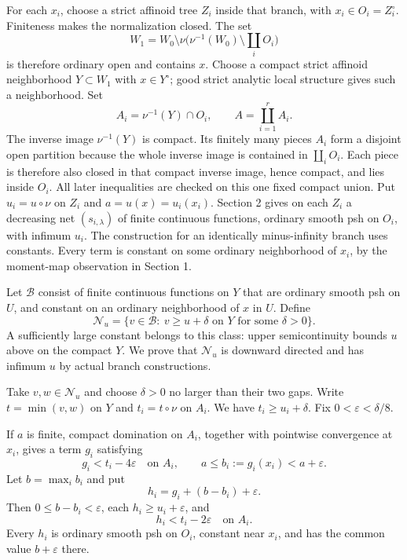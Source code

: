 \documentclass[
  11pt,
]{article}
\begin{document}
For each \(x_i\), choose a strict affinoid tree \(Z_i\) inside that
branch, with \(x_i\in O_i=Z_i^\circ\). Finiteness makes the
normalization closed. The set \[
W_1=W_0\setminus\nu\bigl(\nu^{-1}(W_0)\setminus\textstyle\coprod_i O_i\bigr)
\] is therefore ordinary open and contains \(x\). Choose a compact
strict affinoid neighborhood \(Y\subset W_1\) with \(x\in Y^\circ\);
good strict analytic local structure gives such a neighborhood. Set \[
A_i=\nu^{-1}(Y)\cap O_i,
\qquad A=\coprod_{i=1}^r A_i.
\] The inverse image \(\nu^{-1}(Y)\) is compact. Its finitely many
pieces \(A_i\) form a disjoint open partition because the whole inverse
image is contained in \(\coprod_i O_i\). Each piece is therefore also
closed in that compact inverse image, hence compact, and lies inside
\(O_i\). All later inequalities are checked on this one fixed compact
union. Put \(u_i=u\circ\nu\) on \(Z_i\) and \(a=u(x)=u_i(x_i)\). Section
2 gives on each \(Z_i\) a decreasing net \((s_{i,\lambda})\) of finite
continuous functions, ordinary smooth psh on \(O_i\), with infimum
\(u_i\). The construction for an identically minus-infinity branch uses
constants. Every term is constant on some ordinary neighborhood of
\(x_i\), by the moment-map observation in Section 1.

Let \(\mathcal B\) consist of finite continuous functions on \(Y\) that
are ordinary smooth psh on \(U\), and constant on an ordinary
neighborhood of \(x\) in \(U\). Define \[
\mathcal N_u=\{v\in\mathcal B:\ v\geq u+\delta\text{ on }Y
\text{ for some }\delta>0\}.
\] A sufficiently large constant belongs to this class: upper
semicontinuity bounds \(u\) above on the compact \(Y\). We prove that
\(\mathcal N_u\) is downward directed and has infimum \(u\) by actual
branch constructions.

Take \(v,w\in\mathcal N_u\) and choose \(\delta>0\) no larger than their
two gaps. Write \(t=\min(v,w)\) on \(Y\) and \(t_i=t\circ\nu\) on
\(A_i\). We have \(t_i\geq u_i+\delta\). Fix \(0<\varepsilon<\delta/8\).

If \(a\) is finite, compact domination on \(A_i\), together with
pointwise convergence at \(x_i\), gives a term \(g_i\) satisfying \[
g_i<t_i-4\varepsilon\quad\text{on }A_i,
\qquad a\leq b_i:=g_i(x_i)<a+\varepsilon.
\] Let \(b=\max_i b_i\) and put \[
h_i=g_i+(b-b_i)+\varepsilon.
\] Then \(0\leq b-b_i<\varepsilon\), each \(h_i\geq u_i+\varepsilon\),
and \[
h_i< t_i-2\varepsilon\quad\text{on }A_i.
\] Every \(h_i\) is ordinary smooth psh on \(O_i\), constant near
\(x_i\), and has the common value \(b+\varepsilon\) there.
\end{document}
